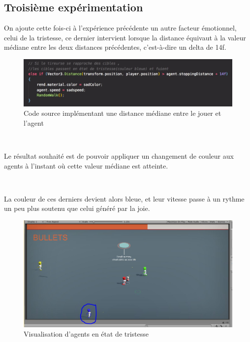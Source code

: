 \subsection{Troisième expérimentation}

On ajoute cette fois-ci à l'expérience précédente un autre facteur émotionnel, celui de la tristesse, ce dernier intervient lorsque la distance équivaut à la valeur médiane entre les deux distances précédentes, c’est-à-dire un delta de 14f.


\begin{figure}[th]
\centering
\includegraphics{Figures/333f.JPG}
\decoRule
\caption[Code source implémentant une distance médiane]{Code source implémentant une distance médiane entre le jouer et l'agent}
\label{fig:bichi}
\end{figure}

~\par
Le résultat souhaité est de pouvoir appliquer un changement de couleur aux agents à l’instant où cette valeur médiane est atteinte. 


~\par
La couleur de ces derniers devient alors bleue, et leur vitesse passe à un rythme un peu plus soutenu que celui généré par la joie.

\begin{figure}[th]
\centering
\includegraphics{Figures/bleu.JPG}
\decoRule
\caption[Visualisation d'agents en état de tristesse]{Visualisation d'agents en état de tristesse}
\label{fig:bichi}
\end{figure}


